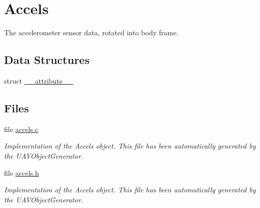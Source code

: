\hypertarget{group___accels}{\section{\-Accels}
\label{group___accels}
}


\-The accelerometer sensor data, rotated into body frame.  


\subsection*{\-Data \-Structures}
\begin{DoxyCompactItemize}
\item 
struct \hyperlink{struct____attribute____}{\-\_\-\-\_\-attribute\-\_\-\-\_\-}
\end{DoxyCompactItemize}
\subsection*{\-Files}
\begin{DoxyCompactItemize}
\item 
file \hyperlink{accels_8c}{accels.\-c}
\begin{DoxyCompactList}\small\item\em \-Implementation of the \-Accels object. \-This file has been automatically generated by the \-U\-A\-V\-Object\-Generator. \end{DoxyCompactList}\item 
file \hyperlink{accels_8h}{accels.\-h}
\begin{DoxyCompactList}\small\item\em \-Implementation of the \-Accels object. \-This file has been automatically generated by the \-U\-A\-V\-Object\-Generator. \end{DoxyCompactList}\end{DoxyCompactItemize}
